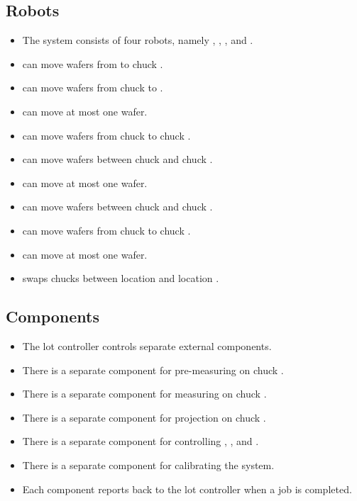 \subsection{Robots}
\begin{itemize}
    \item The system consists of four robots, namely \robotOne, \robotTwo, \robotThree, and \robotSwap.
    \item \robotOne can move wafers from \tray to chuck \chuckIn.
    \item \robotOne can move wafers from chuck \chuckOut to \tray.
    \item \robotOne can move at most one wafer.
    \item \robotTwo can move wafers from chuck \chuckIn to chuck \chuckMeas.
    \item \robotTwo can move wafers between chuck \chuckMeas and chuck \chuckEmptyOne.
    \item \robotOne can move at most one wafer.
    \item \robotThree can move wafers between chuck \chuckMeas and chuck \chuckEmptyTwo.
    \item \robotThree can move wafers from chuck \chuckMeas to chuck \chuckOut.
    \item \robotOne can move at most one wafer.
    \item \robotSwap swaps chucks between location \chuckMeas and location \chuckProj.
\end{itemize}

\subsection{Components}
\begin{itemize}
    \item The lot controller controls separate external components.
    \item There is a separate component for pre-measuring on chuck \chuckIn.
    \item There is a separate component for measuring on chuck \chuckMeas.
    \item There is a separate component for projection on chuck \chuckProj.
    \item There is a separate component for controlling \robotOne, \robotTwo, \robotThree and \robotSwap.
    \item There is a separate component for calibrating the system.
    \item Each component reports back to the lot controller when a job is completed.
\end{itemize}

